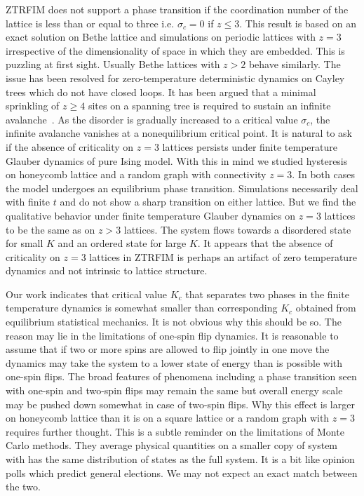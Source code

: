 \documentclass[a4,aps,amsmath,floatfix,nofootinbib,10pt]{revtex4}
\begin{document}
ZTRFIM does not support a phase transition if the coordination number 
of the lattice is less than or equal to three i.e. $\sigma_c=0$ if 
$z\le3$. This result is based on an exact solution on Bethe lattice and 
simulations on periodic lattices with $z=3$ irrespective of the 
dimensionality of space in which they are embedded. This is puzzling at 
first sight. Usually Bethe lattices with $z>2$ behave similarly. The 
issue has been resolved for zero-temperature deterministic dynamics on 
Cayley trees which do not have closed loops. It has been argued that a 
minimal sprinkling of $z \ge 4$ sites on a spanning tree is required to 
sustain an infinite avalanche~\cite{shukla}. As the disorder is 
gradually increased to a critical value $\sigma_c$, the infinite 
avalanche vanishes at a nonequilibrium critical point. It is natural to 
ask if the absence of criticality on $z=3$ lattices persists under 
finite temperature Glauber dynamics of pure Ising model. With this in 
mind we studied hysteresis on honeycomb lattice and a random graph with 
connectivity $z=3$. In both cases the model undergoes an equilibrium 
phase transition. Simulations necessarily deal with finite $t$ and do 
not show a sharp transition on either lattice. But we find the 
qualitative behavior under finite temperature Glauber dynamics on $z=3$ 
lattices to be the same as on $z>3$ lattices. The system flows towards 
a disordered state for small $K$ and an ordered state for large $K$. It 
appears that the absence of criticality on $z=3$ lattices in ZTRFIM is 
perhaps an artifact of zero temperature dynamics and not intrinsic to 
lattice structure.


Our work indicates that critical value $K_c$ that separates two phases 
in the finite temperature dynamics is somewhat smaller than 
corresponding $K_c$ obtained from equilibrium statistical mechanics. It 
is not obvious why this should be so. The reason may lie in the 
limitations of one-spin flip dynamics. It is reasonable to assume that 
if two or more spins are allowed to flip jointly in one move the 
dynamics may take the system to a lower state of energy than is 
possible with one-spin flips. The broad features of phenomena including 
a phase transition seen with one-spin and two-spin flips may remain the 
same but overall energy scale may be pushed down somewhat in case of 
two-spin flips. Why this effect is larger on honeycomb lattice than it 
is on a square lattice or a random graph with $z=3$ requires further 
thought. This is a subtle reminder on the limitations of Monte Carlo 
methods. They average physical quantities on a smaller copy of system 
with has the same distribution of states as the full system. It is a 
bit like opinion polls which predict general elections. We may not 
expect an exact match between the two.
\end{document}
